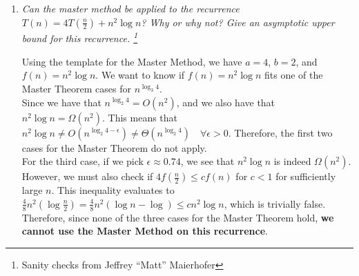 \documentclass[12pt]{article}
\begin{document}
\begin{enumerate}
\begin{enumerate}
    \end{enumerate}
    
    \newpage
    \item \textit{Can the master method be applied to the recurrence $T(n)=4T(\frac{n}{2})+n^2\log n$? Why or why not? Give an asymptotic upper bound for this recurrence. \footnote{Sanity checks from Jeffrey ``Matt'' Maierhofer}}
    
    Using the template for the Master Method, we have $a = 4$, $b = 2$, and $f(n) = n^2\log n$. We want to know if $f(n) = n^2\log n$ fits one of the Master Theorem cases for $n^{\log_3 4}$.\\
    
    Since we have that $n^{\log_2 4} = O(n^2)$, and we also have that $n^2\log n = \Omega(n^2)$. This means that $n^2\log n \neq O(n^{\log_2 4 - \epsilon}) \neq \Theta(n^{\log_2 4}) \hspace{12pt} \forall \epsilon>0$. Therefore, the 
first two cases for the Master Theorem do not apply.\\
    
    For the third case, if we pick $\epsilon \approx 0.74$, we see that $n^2\log n$ is indeed $\Omega(n^2)$. However, we must also check if $4f(\frac{n}{2}) \leq cf(n)$ for $c < 1$ for sufficiently large $n$. This inequality 
evaluates to $\frac{4}{8}n^2(\log \frac{n}{2}) = \frac{4}{8}n^2(\log n - \log ) \leq cn^2\log n$, which is trivially false.\\
    
  Therefore, since none of the three cases for the Master Theorem hold, \textbf{we cannot use the Master Method on this recurrence}.\\
    

\end{enumerate}
\end{document}
